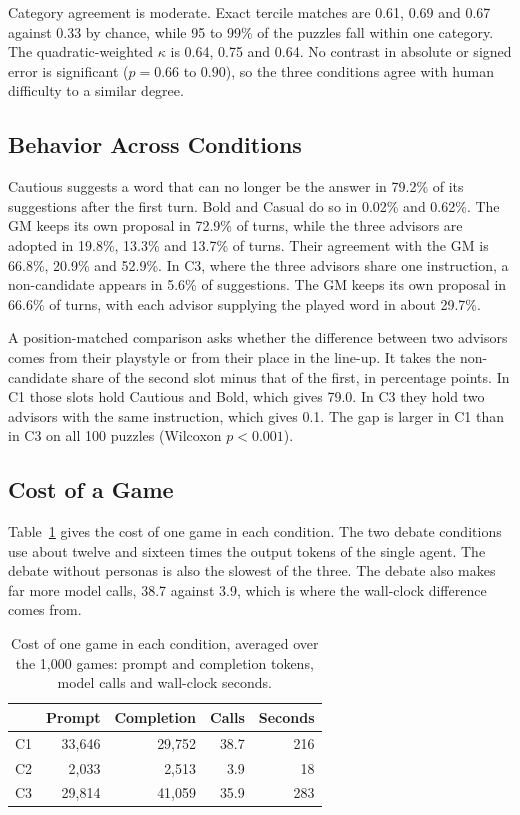 \documentclass[conference]{IEEEtran}
\begin{document}
Category agreement is moderate. Exact tercile matches are 0.61, 0.69 and 0.67 against 0.33 by chance, while 95 to 99\% of the puzzles fall within one category. The quadratic-weighted $\kappa$ is 0.64, 0.75 and 0.64. No contrast in absolute or signed error is significant ($p = 0.66$ to $0.90$), so the three conditions agree with human difficulty to a similar degree.

\subsection{Behavior Across Conditions}
Cautious suggests a word that can no longer be the answer in 79.2\% of its suggestions after the first turn. Bold and Casual do so in 0.02\% and 0.62\%. The GM keeps its own proposal in 72.9\% of turns, while the three advisors are adopted in 19.8\%, 13.3\% and 13.7\% of turns. Their agreement with the GM is 66.8\%, 20.9\% and 52.9\%. In C3, where the three advisors share one instruction, a non-candidate appears in 5.6\% of suggestions. The GM keeps its own proposal in 66.6\% of turns, with each advisor supplying the played word in about 29.7\%.

A position-matched comparison asks whether the difference between two advisors comes from their playstyle or from their place in the line-up. It takes the non-candidate share of the second slot minus that of the first, in percentage points. In C1 those slots hold Cautious and Bold, which gives 79.0. In C3 they hold two advisors with the same instruction, which gives 0.1. The gap is larger in C1 than in C3 on all 100 puzzles (Wilcoxon $p < 0.001$).

\subsection{Cost of a Game}
Table~\ref{tab:cost} gives the cost of one game in each condition. The two debate conditions use about twelve and sixteen times the output tokens of the single agent. The debate without personas is also the slowest of the three. The debate also makes far more model calls, 38.7 against 3.9, which is where the wall-clock difference comes from.

\begin{table}[ht]
\caption{Cost of one game in each condition, averaged over the 1,000 games: prompt and completion tokens, model calls and wall-clock seconds.}
\label{tab:cost}
\centering
\footnotesize
\begin{tabular}{@{}lrrrr@{}}
\hline
 & Prompt & Completion & Calls & Seconds \\
\hline
C1 & 33,646 & 29,752 & 38.7 & 216 \\
C2 & 2,033 & 2,513 & 3.9 & 18 \\
C3 & 29,814 & 41,059 & 35.9 & 283 \\
\hline
\end{tabular}
\end{table}
\end{document}
